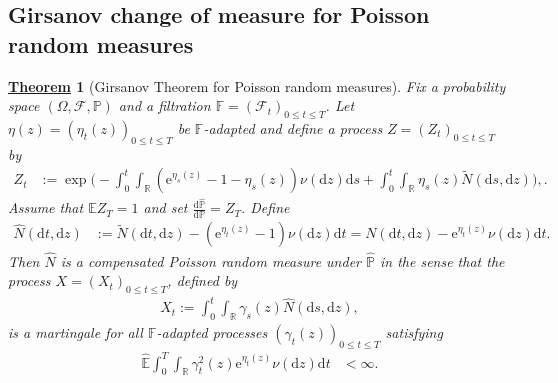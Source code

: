 \documentclass[12pt]{book}
\numberwithin{equation}{chapter}
\theoremstyle{plain}
\newtheorem{theorem}{\underline{Theorem}}
\numberwithin{theorem}{section}
\theoremstyle{definition}
\numberwithin{exercise}{chapter}
\newcommand{\<}{\langle}
\renewcommand{\>}{\rangle}
\renewcommand{\(}{\left(}
\renewcommand{\)}{\right)}
\renewcommand{\[}{\left[}
\renewcommand{\]}{\right]}
\newcommand\Eb{\mathds{E}}
\newcommand\Fb{\mathds{F}}
\newcommand\Pb{\mathds{P}}
\newcommand\Rb{\mathds{R}}
\newcommand\Fc{\mathscr{F}}
\newcommand\Om{\Omega}
\newcommand\gam{\gamma}
\newcommand\Pbh{\widehat{\Pb}}
\newcommand\Ebh{\widehat{\Eb}}
\newcommand\Nh{\widehat{N}}
\newcommand\Nt{\widetilde{N}}
\newcommand\dd{\mathrm{d}}
\newcommand\ee{\mathrm{e}}
\begin{document}
\subsection*{Girsanov change of measure for Poisson random measures}

\begin{theorem}[Girsanov Theorem for Poisson random measures]
\label{thm:girsanov.jump}
Fix a probability space $(\Om,\Fc,\Pb)$ and a filtration $\Fb=(\Fc_t)_{0 \leq t \leq T}$.  Let $\eta(z) = (\eta_t(z))_{0 \leq t \leq T}$ be $\Fb$-adapted and define a process $Z = (Z_t)_{0 \leq t \leq T}$ by
\begin{align}
Z_t
	&:=	\exp \Big( - \int_0^t \int_\Rb \( \ee^{\eta_s(z)} - 1 - \eta_s(z) \) \nu(\dd z) \dd s 
			+ \int_0^t \int_\Rb \eta_s(z) \Nt(\dd s , \dd z) \Big) , \label{eq:Z.jump} .
\end{align}
Assume that $\Eb Z_T = 1$ and set $\frac{\dd \Pbh}{\dd \Pb} = Z_T$.  Define
\begin{align}
\Nh( \dd t, \dd z)
	&:=		\Nt( \dd t , \dd z) - \( \ee^{\eta_t(z)} - 1\)\nu(\dd z) \dd t
	=			N( \dd t , \dd z ) - \ee^{\eta_t(z)} \nu(\dd z) \dd t . \label{eq:N.hat}
\end{align}
Then $\Nh$ is a compensated Poisson random measure under $\Pbh$ in the sense that the process $X = (X_t)_{0 \leq t \leq T}$, defined by
\begin{align}
X_t
	:=	\int_0^t \int_\Rb \gam_s(z) \Nh( \dd s, \dd z) , 
\end{align}
is a martingale for all $\Fb$-adapted processes $(\gam_t(z))_{0 \leq t \leq T}$ satisfying
\begin{align}
\Ebh \int_0^T \int_\Rb \gam_t^2(z) \ee^{\eta_t(z)} \nu(\dd z ) \dd t
	&< \infty .
\end{align}
\end{theorem}
\end{document}
